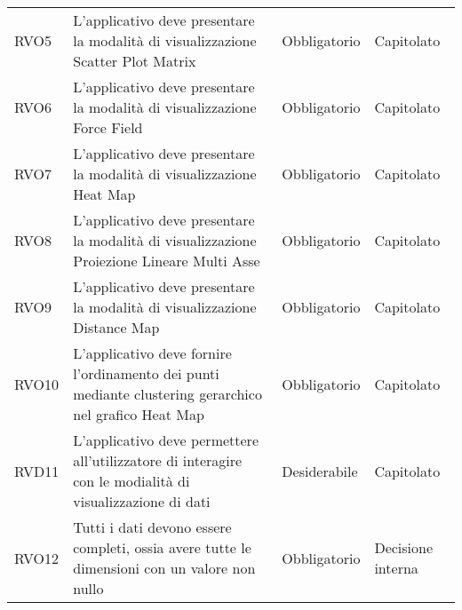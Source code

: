 \begin{longtable}[H]{>{\raggedright\arraybackslash}p{20mm} p{90mm} p{22mm} p{30mm}}
    RVO5
        & L'applicativo deve presentare la modalità di visualizzazione Scatter Plot Matrix
        & Obbligatorio
        & Capitolato \\

    RVO6
        & L'applicativo deve presentare la modalità di visualizzazione Force Field
        & Obbligatorio
        & Capitolato \\

    RVO7
        & L'applicativo deve presentare la modalità di visualizzazione Heat Map
        & Obbligatorio
        & Capitolato \\

    RVO8
        & L'applicativo deve presentare la modalità di visualizzazione Proiezione Lineare Multi Asse
        & Obbligatorio
        & Capitolato \\

    RVO9
        & L'applicativo deve presentare la modalità di visualizzazione Distance Map
        & Obbligatorio
        & Capitolato \\

    RVO10
        & L'applicativo deve fornire l'ordinamento dei punti mediante clustering gerarchico nel grafico Heat Map
        & Obbligatorio
        & Capitolato \\

    RVD11
        & L'applicativo deve permettere all'utilizzatore di interagire con le modialità di visualizzazione di dati
        & Desiderabile
        & Capitolato \\

    RVO12 &
        Tutti i dati devono essere completi, ossia avere tutte le dimensioni con un valore 
        non nullo &
        Obbligatorio &
        Decisione interna \\
\end{longtable}
